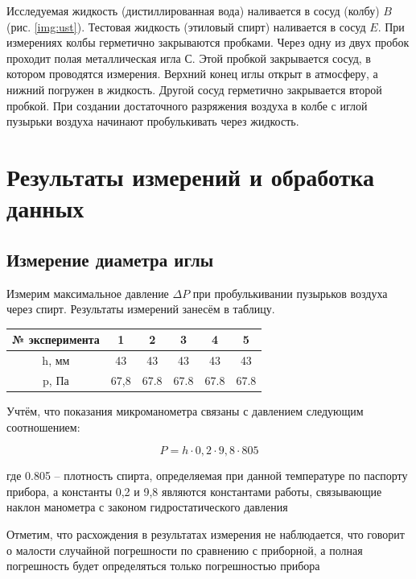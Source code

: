 \documentclass[12pt,a4paper]{article}
\begin{document}
Исследуемая жидкость (дистиллированная вода) наливается в сосуд (колбу) $ B $ (рис. \ref{img:ust}). Тестовая жидкость  (этиловый спирт) наливается  в сосуд $ E $.  При измерениях  колбы герметично закрываются  пробками. Через одну из двух пробок  проходит полая металлическая игла $ С $. Этой пробкой закрывается сосуд, в котором  проводятся измерения. Верхний конец иглы открыт в атмосферу, а нижний погружен в жидкость. Другой сосуд герметично закрывается второй пробкой. При создании достаточного  разряжения воздуха в колбе с иглой пузырьки воздуха начинают пробулькивать через жидкость. 

\newpage

\section{Результаты измерений и обработка данных}

\subsection{Измерение диаметра иглы}

Измерим максимальное давление $ \Delta P $  при  пробулькивании пузырьков воздуха через спирт. Результаты измерений занесём в таблицу.

\begin{center}
\begin{tabular}{|c|c|c|c|c|c|}
\hline 
№ эксперимента & 1 & 2 & 3 & 4 & 5 \\ 
\hline 
h, мм & 43 & 43 & 43 & 43 & 43 \\ 
\hline 
p, Па & 67,8 & 67.8 & 67.8 & 67.8 & 67.8 \\
\hline
\end{tabular} 
\end{center}

Учтём, что показания микроманометра связаны с давлением следующим соотношением:  

\begin{equation}
P=h \cdot 0,2 \cdot 9,8 \cdot 805
\end{equation}

 где 0.805 -- плотность спирта, определяемая при данной температуре по паспорту прибора, а константы 0,2 и 9,8 являются константами работы, связывающие наклон манометра с законом гидростатического давления 

Отметим, что расхождения в результатах измерения не наблюдается, что говорит о малости случайной погрешности по сравнению с приборной, а полная погрешность будет определяться только погрешностью прибора
\end{document}
